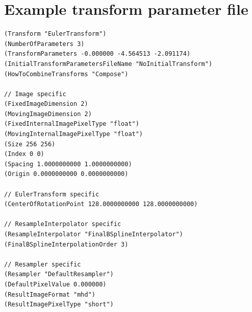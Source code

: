 \documentclass[]{report}
\begin{document}

\chapter{Example transform parameter file}\label{chp:ExampleTransformParam}

\begin{verbatim}
(Transform "EulerTransform")
(NumberOfParameters 3)
(TransformParameters -0.000000 -4.564513 -2.091174)
(InitialTransformParametersFileName "NoInitialTransform")
(HowToCombineTransforms "Compose")

// Image specific
(FixedImageDimension 2)
(MovingImageDimension 2)
(FixedInternalImagePixelType "float")
(MovingInternalImagePixelType "float")
(Size 256 256)
(Index 0 0)
(Spacing 1.0000000000 1.0000000000)
(Origin 0.0000000000 0.0000000000)

// EulerTransform specific
(CenterOfRotationPoint 128.0000000000 128.0000000000)

// ResampleInterpolator specific
(ResampleInterpolator "FinalBSplineInterpolator")
(FinalBSplineInterpolationOrder 3)

// Resampler specific
(Resampler "DefaultResampler")
(DefaultPixelValue 0.000000)
(ResultImageFormat "mhd")
(ResultImagePixelType "short")
\end{verbatim}


\newpage
\pagestyle{plain} 


\end{document}
